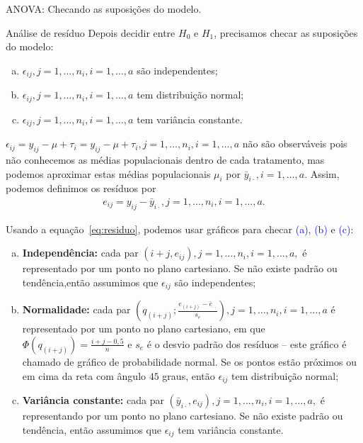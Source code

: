 \documentclass[8pt]{beamer}
\begin{document}
\begin{frame}{ANOVA: Checando as suposições do modelo.}

\small
\begin{block}{Análise de resíduo}
	Depois decidir entre $H_0$ e $H_1$, precisamos checar as suposições do modelo:
	\begin{enumerate}[(a)]
		\item $\epsilon_{ij}, j=1, \dots, n_i, i=1, \dots, a$ são independentes;
		\item $\epsilon_{ij}, j=1, \dots, n_i, i=1, \dots, a$ tem distribuição normal;
		\item  $\epsilon_{ij}, j=1, \dots, n_i, i=1, \dots, a$ tem variância constante.
	\end{enumerate} 
	
	$\epsilon_{ij} = y_{ij} - \mu + \tau_i  = y_{ij} - \mu + \tau_i, j=1, \dots, n_i, i=1, \dots, a$ não são observáveis pois não conhecemos as médias populacionais dentro de cada tratamento, mas podemos aproximar estas médias populacionais $\mu_i$ por  $\bar{y}_{i\cdot}, i=1, \dots, a$. Assim, podemos definimos os resíduos por
	\begin{align}\label{eq:residuo}
	e_{ij} = y_{ij} - \bar{y}_{i\cdot}, j=1, \dots, n_i, i=1, \dots, a.
	\end{align}
	
	Usando a equação~\eqref{eq:residuo}, podemos usar gráficos para checar \textcolor{blue}{(a)}, \textcolor{blue}{(b)} e \textcolor{blue}{(c)}:
	\begin{enumerate}[(a)]
		\item \textbf{Independência:} cada par $(i+j, e_{ij}), j=1, \dots, n_i, i=1, \dots, a,$ é representado por um ponto no plano cartesiano. Se não existe padrão ou tendência,então assumimos que $\epsilon_{ij}$ são independentes;
		\item \textbf{Normalidade:} cada par $\left(q_{(i+j)}; \frac{e_{(i+j)} - \bar{e}_{\cdot\cdot}}{s_e}  \right)$$, j=1, \dots, n_i, i=1, \dots, a$ é representado por um ponto no plano cartesiano, em que $\Phi(q_{(i+j)}) = \frac{i+j-0,5}{n}$ e $s_e$ é o desvio padrão dos resíduos -- este gráfico é chamado de gráfico de probabilidade normal. Se os pontos estão próximos ou em cima da reta com ângulo $45$ graus, então $\epsilon_{ij}$ tem distribuição normal;
		\item \textbf{Variância constante:} cada par $\left( \bar{y}_{i\cdot}, e_{ij} \right), j=1, \dots, n_i, i=1, \dots, a,$ é representando por um ponto no plano cartesiano. Se não existe padrão ou tendência, então assumimos que $\epsilon_{ij}$ tem variância constante.
	\end{enumerate}
\end{block}
\normalsize

\end{frame}
\end{document}
